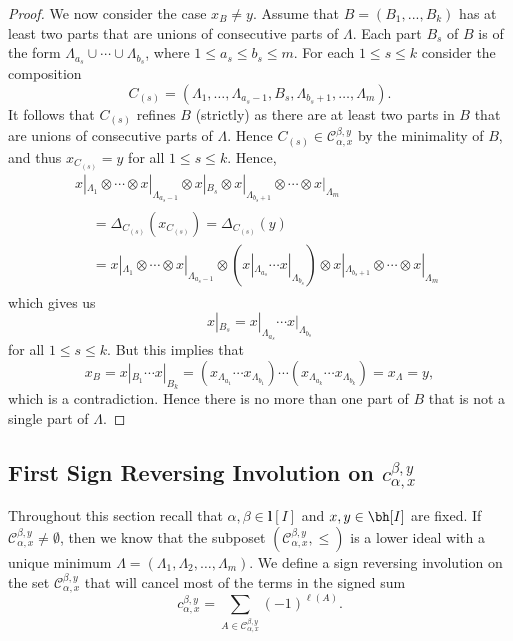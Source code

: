 \begin{proof}
We now consider the case $x_B\ne y$.
Assume that $B=(B_1,...,B_k)$ has at least two parts that are unions of consecutive parts of $\Lambda$. Each part $B_s$ of $B$ is of the form $\Lambda_{a_s}\cup\cdots\cup\Lambda_{b_s}$, where $1\leq a_s\leq b_s\leq m$. For each $1\leq s\leq k$ consider the composition 
 $$ C_{(s)}=(\Lambda_1,\ldots,\Lambda_{a_s-1},B_s,\Lambda_{b_s+1},\ldots,\Lambda_m).
 $$
It follows that $C_{(s)}$ refines $B$ (strictly) as there are at least two parts in $B$ that are unions of consecutive parts of $\Lambda$. Hence $C_{(s)}\in \mathcal{C}_{\alpha,x}^{\beta,y}$ by the minimality of $B$, and thus $x_{C_{(s)}}=y$ for all $1\le s\le k$. Hence,
 \begin{multline*}
x|_{\Lambda_1}\otimes\cdots\otimes x|_{\Lambda_{a_s-1}}\otimes x|_{B_s}\otimes x|_{\Lambda_{b_s+1}} 
 \otimes\cdots\otimes x|_{\Lambda_m} \\
 \begin{aligned}
 &= \Delta_{C_{(s)}}(x_{C_{(s)}}) = \Delta_{C_{(s)}}(y) \\
 &= x|_{\Lambda_1}\otimes\cdots\otimes x|_{\Lambda_{a_s-1}}\otimes(x|_{\Lambda_{a_s}}\cdots x|_{\Lambda_{b_s}})\otimes x|_{\Lambda_{b_s+1}}
 \otimes\cdots\otimes x|_{\Lambda_m}
 \end{aligned}
\end{multline*}
 which gives us
 $$ x|_{B_s} = x|_{\Lambda_{a_s}}\cdots x|_{\Lambda_{b_s}}$$
 for all $1\le s\le k$. But this implies that
 $$ x_B = x|_{B_1} \cdots x|_{B_k} =(x_{\Lambda_{a_1}}\cdots x_{\Lambda_{b_1}})\cdots (x_{\Lambda_{a_k}}\cdots x_{\Lambda_{b_k}})=x_\Lambda=y,$$
 which is a contradiction. Hence there is no more than one part of $B$ that is not a single part of $\Lambda$.
\end{proof}

\subsection{First Sign Reversing Involution on \texorpdfstring{$c_{\alpha,x}^{\beta,y}$}{c alpha,x beta,y}}\label{ss:involution}
Throughout this section recall that $\alpha,\beta\in\mathbf{l} [I]$ and $x,y\in\bh [I]$ are fixed. If $\mathcal{C}_{\alpha,x}^{\beta,y}\ne\emptyset$, then we know that the subposet $(\mathcal{C}_{\alpha,x}^{\beta,y},\le)$ is a lower ideal with a unique minimum $\Lambda=(\Lambda_1,\Lambda_2,\ldots,\Lambda_m)$. 
We define a sign reversing involution on the set $\mathcal{C}_{\alpha,x}^{\beta,y}$ that will cancel most of the terms in the signed sum
\begin{equation}\label{eq:anticoef}
 c_{\alpha,x}^{\beta,y}=\sum_{A\in \mathcal{C}_{\alpha,x}^{\beta,y}} (-1)^{\ell(A)}.
\end{equation}

